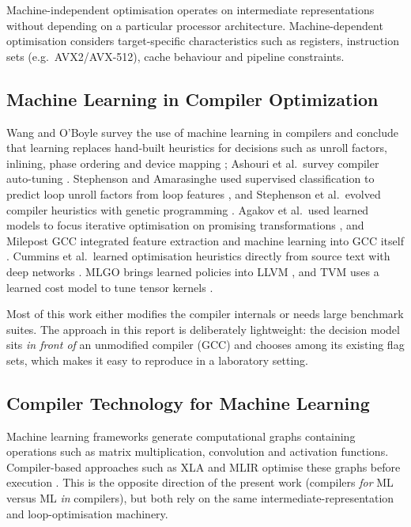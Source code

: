 Machine-independent optimisation operates on intermediate representations
without depending on a particular processor architecture. Machine-dependent
optimisation considers target-specific characteristics such as registers,
instruction sets (e.g.\ AVX2/AVX-512), cache behaviour and pipeline constraints.

\subsection{Machine Learning in Compiler Optimization}

Wang and O'Boyle survey the use of machine learning in compilers and conclude that
learning replaces hand-built heuristics for decisions such as unroll factors,
inlining, phase ordering and device mapping \cite{wang2018}; Ashouri et al.\ survey
compiler auto-tuning \cite{ashouri2018}. Stephenson and Amarasinghe used supervised
classification to predict loop unroll factors from loop features
\cite{stephenson2005}, and Stephenson et al.\ evolved compiler heuristics with
genetic programming \cite{stephenson2003}. Agakov et al.\ used learned models to
focus iterative optimisation on promising transformations \cite{agakov2006}, and
Milepost GCC integrated feature extraction and machine learning into GCC itself
\cite{fursin2011}. Cummins et al.\ learned optimisation heuristics directly from
source text with deep networks \cite{cummins2017}. MLGO brings
learned policies into LLVM \cite{trofin2021}, and TVM uses a learned cost model
to tune tensor kernels \cite{chen2018}.

Most of this work either modifies the compiler internals or needs large benchmark suites. The approach in
this report is deliberately lightweight: the decision model sits \emph{in front of}
an unmodified compiler (GCC) and chooses among its existing flag sets, which makes it
easy to reproduce in a laboratory setting.

\subsection{Compiler Technology for Machine Learning}

Machine learning frameworks generate computational graphs containing
operations such as matrix multiplication, convolution and activation functions.
Compiler-based approaches such as XLA and MLIR optimise these graphs before
execution \cite{abadi2016,lattner2021}. This is the opposite direction of the
present work (compilers \emph{for} ML versus ML \emph{in} compilers), but both
rely on the same intermediate-representation and loop-optimisation machinery.

